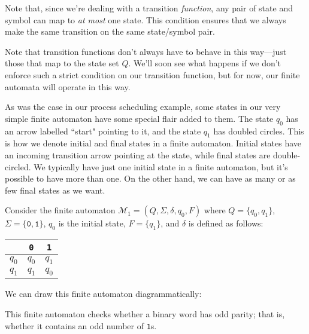 Note that, since we're dealing with a transition \emph{function}, any pair of state and symbol can map to \emph{at most} one state. This condition ensures that we always make the same transition on the same state/symbol pair.

\begin{remark}
Note that transition functions don't always have to behave in this way---just those that map to the state set $Q$. We'll soon see what happens if we don't enforce such a strict condition on our transition function, but for now, our finite automata will operate in this way.
\end{remark}

As was the case in our process scheduling example, some states in our very simple finite automaton have some special flair added to them. The state $q_{0}$ has an arrow labelled ``start" pointing to it, and the state $q_{1}$ has doubled circles. This is how we denote initial and final states in a finite automaton. Initial states have an incoming transition arrow pointing at the state, while final states are double-circled. We typically have just one initial state in a finite automaton, but it's possible to have more than one. On the other hand, we can have as many or as few final states as we want.

\begin{example}
Consider the finite automaton $\mathcal{M}_{1} = (Q, \Sigma, \delta, q_{0}, F)$ where $Q = \{q_{0}, q_{1}\}$, $\Sigma = \{\texttt{0}, \texttt{1}\}$, $q_{0}$ is the initial state, $F = \{q_{1}\}$, and $\delta$ is defined as follows:
\begin{center}
\small
\begin{tabular}{c | c c}
		& \texttt{0}		& \texttt{1} \\
\hline
$q_{0}$	& $q_{0}$		& $q_{1}$ \\
$q_{1}$	& $q_{1}$		& $q_{0}$
\end{tabular}
\end{center}
We can draw this finite automaton diagrammatically:
\begin{center}
\end{center}
This finite automaton checks whether a binary word has odd parity; that is, whether it contains an odd number of \texttt{1}s.
\end{example}

